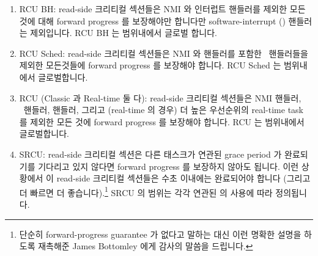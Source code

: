 \begin{enumerate}
\item	RCU BH: read-side 크리티컬 섹션들은 NMI 와 인터럽트 핸들러를 제외한
	모든 것에 대해 forward progress 를 보장해야만 합니다만
	software-interrupt () 핸들러는 제외입니다.
	RCU BH 는 범위내에서 글로벌 합니다.
\item	RCU Sched: read-side 크리티컬 섹션들은 NMI 와  핸들러를
	포함한 \IRQ\ 핸들러들을 제외한 모든것들에 forward progress 를 보장해야
	합니다.
	RCU Sched 는 범위내에서 글로벌합니다.
\item	RCU (Classic 과 Real-time 둘 다): read-side 크리티컬 섹션들은 NMI
	핸들러, \IRQ\ 핸들러,  핸들러, 그리고 (real-time 의 경우) 더
	높은 우선순위의 real-time task 를 제외한 모든 것에 forward progress 를
	보장해야 합니다.
	RCU 는 범위내에서 글로벌합니다.
\item	SRCU: read-side 크리티컬 섹션은 다른 태스크가 연관된 grace period 가
	완료되기를 기다리고 있지 않다면 forward progress 를 보장하지 않아도
	됩니다.
	이런 상황에서 이 read-side 크리티컬 섹션들은 수초 이내에는 완료되어야
	합니다 (그리고 더 빠르면 더 좋습니다).\footnote{
		단순히 forward-progress guarantee 가 없다고 말하는 대신 이런
		명확한 설명을 하도록 재촉해준 James Bottomley 에게 감사의
		말씀을 드립니다.}
	SRCU 의 범위는 각각 연관된  의 사용에 따라 정의됩니다.
\iffalse

\item	RCU BH: read-side critical sections
	must guarantee forward progress against everything except for
	NMI and interrupt handlers, but not including software-interrupt
	(\co{softirq}) handlers.
	RCU BH is global in scope.
\item	RCU Sched: read-side critical sections must guarantee forward
	progress against everything except for NMI and \IRQ\ handlers,
	including \co{softirq} handlers.
	RCU Sched is global in scope.
\item	RCU (both classic and real-time): read-side critical sections
	must guarantee forward progress against everything except for
	NMI handlers, \IRQ\ handlers, \co{softirq} handlers, and (in the
	real-time case) higher-priority real-time tasks.
	RCU is global in scope.
\item	SRCU: read-side critical sections need not guarantee
	forward progress unless some other task is waiting for the
	corresponding grace period to complete, in which case these
	read-side critical sections should complete in no more than
	a few seconds (and preferably much more quickly).\footnote{
		Thanks to James Bottomley for urging me to this
		formulation, as opposed to simply saying that
		there are no forward-progress guarantees.}
	SRCU's scope is defined by the use of the corresponding
	\co{srcu_struct}.
\fi
\end{enumerate}

